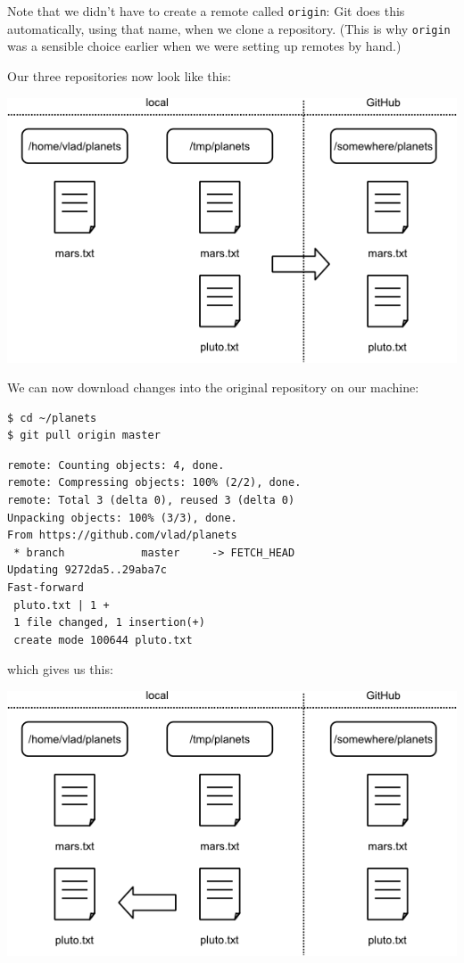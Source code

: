 \documentclass{book}
\begin{document}
Note that we didn't have to create a remote called \texttt{origin}: Git
does this automatically, using that name, when we clone a repository.
(This is why \texttt{origin} was a sensible choice earlier when we were
setting up remotes by hand.)

Our three repositories now look like this:

\includegraphics{novice/git/img/git-after-change-to-duplicate-repo.png}

We can now download changes into the original repository on our machine:

\begin{verbatim}
$ cd ~/planets
$ git pull origin master
\end{verbatim}

\begin{verbatim}
remote: Counting objects: 4, done.
remote: Compressing objects: 100% (2/2), done.
remote: Total 3 (delta 0), reused 3 (delta 0)
Unpacking objects: 100% (3/3), done.
From https://github.com/vlad/planets
 * branch            master     -> FETCH_HEAD
Updating 9272da5..29aba7c
Fast-forward
 pluto.txt | 1 +
 1 file changed, 1 insertion(+)
 create mode 100644 pluto.txt
\end{verbatim}

which gives us this:

\includegraphics{novice/git/img/git-after-pulling-to-local-repo.png}
\end{document}
